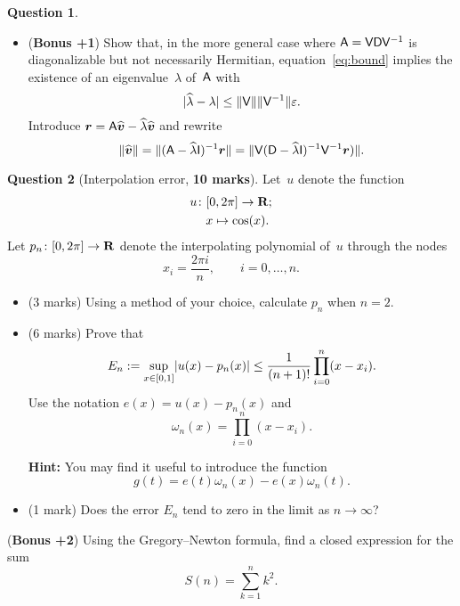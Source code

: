 \documentclass[11pt]{article}
\theoremstyle{definition}
\newtheorem{question}{Question}
\begin{document}
\begin{question}
\begin{itemize}
        \item
            (\textbf{Bonus +1}) Show that, in the more general case where $\mathsf A = \mathsf V \mathsf D \mathsf V^{-1}$ is diagonalizable but not necessarily Hermitian,
            equation~\eqref{eq:bound} implies the existence of an eigenvalue~$\lambda$ of~$\mathsf A$ with
            \[
                \lvert\widehat \lambda - \lambda\rvert \leq \lVert\mathsf V\rVert \lVert\mathsf V^{-1}\rVert \varepsilon.
            \]
            Introduce $\mathbf{\boldsymbol{r}} = \mathsf A \widehat{\mathbf{\boldsymbol{v}}} - \widehat{\lambda} \widehat{\mathbf{\boldsymbol{v}}}$ and rewrite
            \[
                \lVert\widehat {\mathbf{\boldsymbol{v}}}\rVert = \lVert(\mathsf A - \widehat \lambda \mathsf I)^{-1}  {\mathbf{\boldsymbol{r}}}\rVert
                = \lVert\mathsf V (\mathsf D - \widehat \lambda \mathsf I)^{-1}  \mathsf V^{-1} {\mathbf{\boldsymbol{r}}})\rVert.
            \]
    \end{itemize}
\end{question}

\newpage
\begin{question}
    [Interpolation error, \textbf{10 marks}]
    Let~$u$ denote the function
    \begin{align*}
        u\colon
        &[0, 2\pi] \to \mathbf R; \\
        &x \mapsto \cos(x).
    \end{align*}
    Let $p_n \colon [0, 2 \pi] \to \mathbf R$ denote the interpolating polynomial of~$u$ through the nodes
    \[
        x_i = \frac{2 \pi i}{n}, \qquad i = 0, \dotsc, n.
    \]
    \begin{itemize}
        \item
            (3 marks)
            Using a method of your choice,
            calculate $p_n$ when $n = 2$.

        \item
            (6 marks)
            Prove that
            \[
                E_n := \sup_{x \in [0, 1]} \lvert u(x) - p_n(x)\rvert
                \leq \frac{1}{(n+1)!} \prod_{i=0}^{n} (x - x_i).
            \]
            Use the notation $e(x) = u(x) - p_n(x)$ and
            \[
                \omega_n(x) = \prod_{i=0}^{n} (x - x_i).
            \]

            \textbf{Hint:} You may find it useful to introduce the function
            \[
                g(t) = e(t) \omega_n(x) - e(x) \omega_n(t).
            \]
        \item (1 mark) Does the error $E_n$ tend to zero in the limit as $n \to \infty$?
    \end{itemize}

    \noindent (\textbf{Bonus +2}) Using the Gregory--Newton formula,
    find a closed expression for the sum
    \[
        S(n) = \sum_{k=1}^{n} k^2.
    \]
\end{question}
\end{document}
